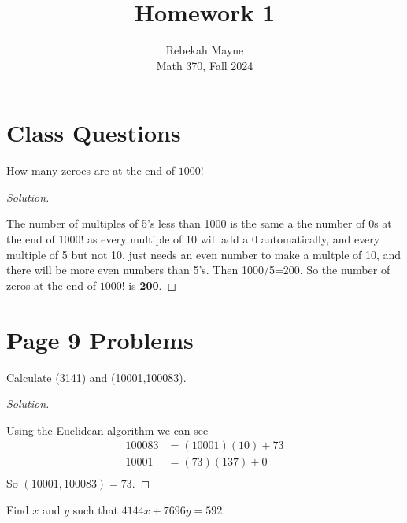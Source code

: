 \documentclass[11pt]{article}
\newenvironment{problem}[2][Problem]{\begin{trivlist}
\item[\hskip \labelsep {\bfseries #1}\hskip \labelsep {\bfseries #2.}]}{\end{trivlist}}
\newenvironment{solution}
  {\renewcommand\qedsymbol{$~$}\begin{proof}[Solution]$ $\par\nobreak\ignorespaces}
  {\end{proof}}
\begin{document}
\title{Homework 1}
\author{Rebekah Mayne\\
  Math 370, Fall 2024}
\maketitle


\section{Class Questions}

\begin{problem}{1}
How many zeroes are at the end of $1000!$
\end{problem}

\begin{solution}
  The number of multiples of 5's less than 1000 is the same a the number of 0s at the end of $1000!$ as every multiple of 10
  will add a 0 automatically, and every multiple of 5 but not 10, just needs an even number to make a multple of 10, and there
  will be more even numbers than 5's. Then 1000/5=200. So the number of zeros at the end of $1000!$ is \textbf{200}.
\end{solution}



\section{Page 9 Problems}

\begin{problem}{2}
Calculate (3141) and (10001,100083).
\end{problem}

\begin{solution}
  Using the Euclidean algorithm we can see
  \begin{align*}
    100083 & = (10001)(10)+ 73 \\
    10001  & = (73)(137) + 0   \\
  \end{align*}
  So $(10001,100083)=73$.
\end{solution}


\begin{problem}{4}
Find $x$ and $y$ such that $4144x+7696y=592$.
\end{problem}
\end{document}
